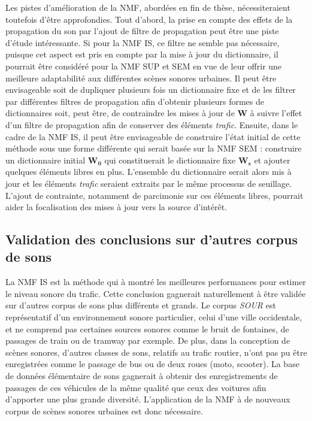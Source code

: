 Les pistes d'amélioration de la NMF, abordées en fin de thèse, nécessiteraient toutefois d'être approfondies. 
Tout d'abord, la prise en compte des effets de la propagation du son par l'ajout de filtre de propagation peut être une piste d'étude intéressante. Si pour la NMF IS, ce filtre ne semble pas nécessaire, puisque cet aspect est pris en compte par la mise à jour du dictionnaire, il pourrait être considéré pour la NMF SUP et SEM en vue de leur offrir une meilleure adaptabilité aux différentes scènes sonores urbaines. Il peut être envisageable soit de dupliquer plusieurs fois un dictionnaire fixe et de les filtrer par différentes filtres de propagation afin d'obtenir plusieurs formes de dictionnaires soit, peut être, de contraindre les mises à jour de $\mathbf{W}$ à suivre l'effet d'un filtre de propagation afin de conserver des éléments \textit{trafic}.
Ensuite, dans le cadre de la NMF IS, il peut être envisageable de construire l'état initial de cette méthode  sous une forme différente qui serait basée sur la NMF SEM : construire un dictionnaire initial $\mathbf{W_0}$ qui constituerait le dictionnaire fixe $\mathbf{W_s}$ et ajouter quelques éléments libres en plus. L'ensemble du dictionnaire serait alors mis à jour et les éléments \textit{trafic} seraient extraits par le même processus de seuillage. L'ajout de contrainte, notamment de parcimonie sur ces éléments libres, pourrait aider la focalisation des mises à jour vers la source d'intérêt.

\subsection*{Validation des conclusions sur d'autres corpus de sons}
La NMF IS  est la méthode qui à montré les meilleures performances pour estimer le niveau sonore du trafic.  Cette conclusion gagnerait naturellement à être validée sur d'autres corpus de sons plus différents et grands. Le corpus \textit{SOUR} est représentatif d'un environnement sonore particulier, celui d'une ville occidentale, et ne comprend pas certaines sources sonores comme le bruit de fontaines, de passages de train ou de tramway par exemple. De plus, dans la conception de scènes sonores, d'autres classes de sons, relatifs au trafic routier, n'ont pas pu être enregistrées comme le passage de bus ou de deux roues (moto, scooter). La base de données élémentaire de sons gagnerait à obtenir des enregistrements de passages de ces véhicules de la même qualité que ceux des voitures afin d'apporter une plus grande diversité. L'application de la NMF à de nouveaux corpus de scènes sonores urbaines est donc nécessaire.

